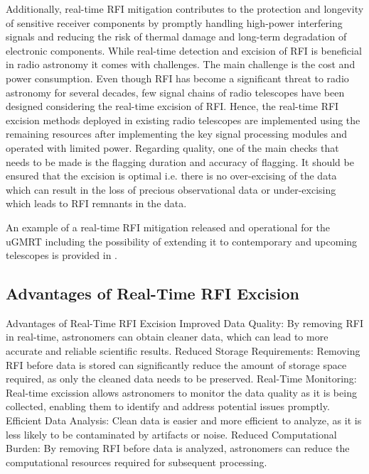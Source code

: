 Additionally, real-time RFI mitigation contributes to the protection and longevity of sensitive receiver components by promptly handling high-power interfering signals and reducing the risk of thermal damage and long-term degradation of electronic components.
While real-time detection and excision of RFI is beneficial in radio astronomy it comes with challenges. The main challenge is the cost and power consumption. Even though RFI has become a significant threat to radio astronomy for several decades, few signal chains of radio telescopes have been designed considering the real-time excision of RFI. Hence, the real-time RFI excision methods deployed in existing radio telescopes are implemented using the remaining resources after implementing the key signal processing modules and operated with limited power. Regarding quality, one of the main checks that needs to be made is the flagging duration and accuracy of flagging.  It should be ensured that the excision is optimal i.e. there is no over-excising of the data which can result in the loss of precious observational data or under-excising which leads to RFI remnants in the data.


An example of a real-time RFI mitigation released and operational for the uGMRT including the possibility of extending it to contemporary and upcoming telescopes is provided in \cite{buch2023real}.


\subsection{Advantages of Real-Time RFI Excision}
\label{subsection:hardware:introduction:advantages}

Advantages of Real-Time RFI Excision
Improved Data Quality: By removing RFI in real-time, astronomers can obtain cleaner data, which can lead to more accurate and reliable scientific results.
Reduced Storage Requirements: Removing RFI before data is stored can significantly reduce the amount of storage space required, as only the cleaned data needs to be preserved.
Real-Time Monitoring: Real-time excission allows astronomers to monitor the data quality as it is being collected, enabling them to identify and address potential issues promptly.
Efficient Data Analysis: Clean data is easier and more efficient to analyze, as it is less likely to be contaminated by artifacts or noise.
Reduced Computational Burden: By removing RFI before data is analyzed, astronomers can reduce the computational resources required for subsequent processing.

